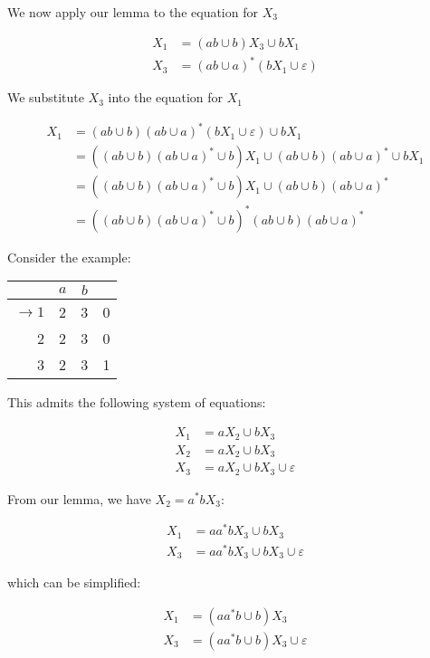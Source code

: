 We now apply our lemma to the equation for $X_3$

\begin{align*}
      X_1 &= (ab\cup b)X_3\cup bX_1\\
      X_3 &= (ab\cup a)^*(bX_1\cup\varepsilon)
\end{align*}

We substitute $X_3$ into the equation for $X_1$

\begin{align*}
      X_1&=(ab\cup b)(ab\cup a)^*(bX_1\cup\varepsilon)\cup bX_1\\
         &=\left((ab\cup b)(ab\cup a)^*\cup b\right)X_1\cup (ab\cup b)(ab\cup a)^*\cup bX_1\\
         &=\left((ab\cup b)(ab\cup a)^*\cup b\right)X_1\cup (ab\cup b)(ab\cup a)^*\\
         &=\left((ab\cup b)(ab\cup a)^*\cup b\right)^*(ab\cup b)(ab\cup a)^*
\end{align*}

Consider the example:

\begin{center}\begin{tabular}{r| c c r}
      & $a$ & $b$ & \\\hline
      $\to 1$ & 2 & 3 & 0\\
            2 & 2 & 3 & 0\\
            3 & 2 & 3 & 1
 \end{tabular}\end{center}

 This admits the following system of equations:

 \begin{align*}
      X_1 &= aX_2\cup bX_3\\
      X_2 &= aX_2\cup bX_3\\
      X_3 &= aX_2\cup bX_3\cup\varepsilon
\end{align*}

From our lemma, we have $X_2=a^*bX_3$:

\begin{align*}
      X_1 &= aa^*bX_3\cup bX_3\\
      X_3 &= aa^*bX_3\cup bX_3\cup\varepsilon
\end{align*}

which can be simplified:

\begin{align*}
      X_1 &= (aa^*b\cup b)X_3\\
      X_3 &= (aa^*b\cup b)X_3\cup\varepsilon
\end{align*}

